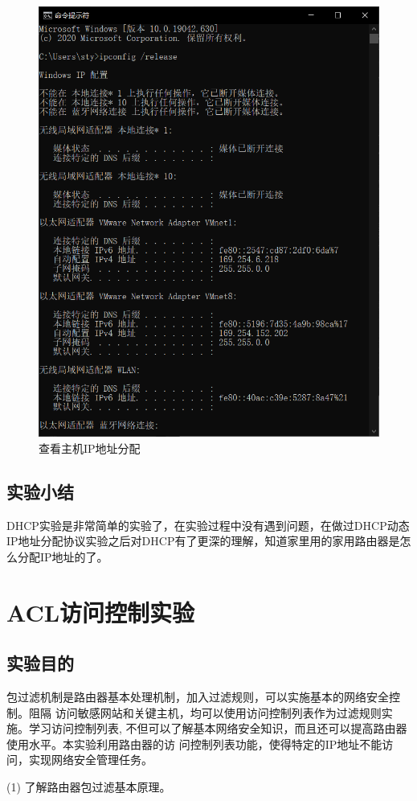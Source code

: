 \documentclass[lang=cn,11pt,a4paper,cite=authoryear]{elegantpaper}
\begin{document}
\begin{figure}[htbp]
	\centering
	\includegraphics[width=0.7\linewidth]{image/screenshot029}
	\caption{查看主机IP地址分配}
	\label{fig:screenshot029}
\end{figure}

\subsection{实验小结}

DHCP实验是非常简单的实验了，在实验过程中没有遇到问题，在做过DHCP动态IP地址分配协议实验之后对DHCP有了更深的理解，知道家里用的家用路由器是怎么分配IP地址的了。

\section{ACL访问控制实验}
\subsection{实验目的}

包过滤机制是路由器基本处理机制，加入过滤规则，可以实施基本的网络安全控制。阻隔 访问敏感网站和关键主机，均可以使用访问控制列表作为过滤规则实施。学习访问控制列表, 不但可以了解基本网络安全知识，而且还可以提高路由器使用水平。本实验利用路由器的访 问控制列表功能，使得特定的IP地址不能访问，实现网络安全管理任务。

(1)	了解路由器包过滤基本原理。
\end{document}

